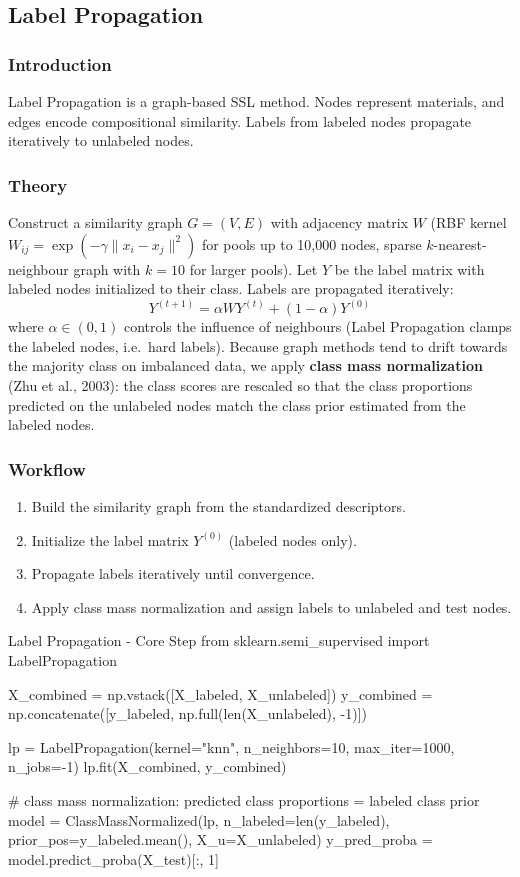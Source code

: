\subsection{Label Propagation}

\subsubsection{Introduction}
Label Propagation is a graph-based SSL method. Nodes represent materials, and edges encode
compositional similarity. Labels from labeled nodes propagate iteratively to unlabeled nodes.

\subsubsection{Theory}
Construct a similarity graph $G = (V, E)$ with adjacency matrix $W$ (RBF kernel
$W_{ij}=\exp(-\gamma\|x_i-x_j\|^2)$ for pools up to 10,000 nodes, sparse $k$-nearest-neighbour
graph with $k=10$ for larger pools). Let $Y$ be the label matrix with labeled nodes initialized
to their class. Labels are propagated iteratively:
\[
Y^{(t+1)} = \alpha W Y^{(t)} + (1-\alpha) Y^{(0)}
\]
where $\alpha \in (0,1)$ controls the influence of neighbours (Label Propagation clamps the
labeled nodes, i.e.\ hard labels). Because graph methods tend to drift towards the majority
class on imbalanced data, we apply \textbf{class mass normalization} (Zhu et al., 2003): the
class scores are rescaled so that the class proportions predicted on the unlabeled nodes match
the class prior estimated from the labeled nodes.

\subsubsection{Workflow}
\begin{enumerate}
  \item Build the similarity graph from the standardized descriptors.
  \item Initialize the label matrix $Y^{(0)}$ (labeled nodes only).
  \item Propagate labels iteratively until convergence.
  \item Apply class mass normalization and assign labels to unlabeled and test nodes.
\end{enumerate}

\begin{pycode}{Label Propagation - Core Step}
from sklearn.semi_supervised import LabelPropagation

X_combined = np.vstack([X_labeled, X_unlabeled])
y_combined = np.concatenate([y_labeled, np.full(len(X_unlabeled), -1)])

lp = LabelPropagation(kernel="knn", n_neighbors=10, max_iter=1000, n_jobs=-1)
lp.fit(X_combined, y_combined)

# class mass normalization: predicted class proportions = labeled class prior
model = ClassMassNormalized(lp, n_labeled=len(y_labeled), prior_pos=y_labeled.mean(),
                            X_u=X_unlabeled)
y_pred_proba = model.predict_proba(X_test)[:, 1]
\end{pycode}

